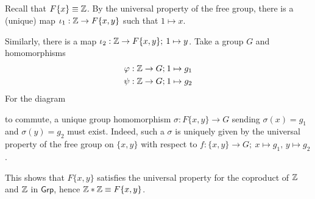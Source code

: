 \documentclass[12pt]{article}
\begin{document}
\subsection{} 
Recall that $F\{x\} \equiv \Z$. 
By the universal property of the free group, there is a (unique) map $\iota_1: \mathbb{Z} \rightarrow F\{x, y\}$ such that $1 \mapsto x$. 
\begin{center}  
   \hspace{1.5em}
\end{center}
Similarly, there is a map $\iota_2: \mathbb{Z} \rightarrow F\{x, y\}; \: 1 \mapsto y$. 
Take a group $G$ and homomorphisms 
\begin{align*}
  \varphi: \mathbb{Z} \rightarrow G; \: & 1 \mapsto g_1 \\ 
  \psi: \mathbb{Z} \rightarrow G; \: & 1 \mapsto g_2 
\end{align*}
For the diagram 
\begin{center}
\end{center}
to commute, a unique group homomorphism $\sigma:F\{x, y\} \rightarrow G$ sending $\sigma(x) = g_1$ and $\sigma(y) = g_2$ must exist. 
Indeed, such a $\sigma$ is uniquely given by the universal property of the free group on $\{x, y\}$ with respect to $f: \{x, y\} \rightarrow G; \: x \mapsto g_1, \, y \mapsto g_2$. 
\begin{center}
\end{center}
This shows that $F\{x, y\}$ satisfies the universal property for the coproduct of $\mathbb{Z}$ and $\mathbb{Z}$ in $\mathsf{Grp}$, hence $\Z * \Z \equiv F\{x, y\}$. 

\setcounter{subsection}{7} 
\end{document}
